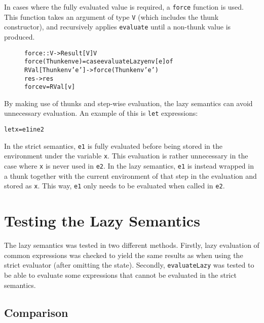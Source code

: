 In cases where the fully evaluated value is required, a \texttt{force} function is used.
This function takes an argument of type \texttt{V} (which includes the thunk constructor),
and recursively applies \texttt{evaluate} until a non-thunk value is produced.

\begin{figure}[!ht]
\begin{alltt}
force :: V -> Result [V] V
force (Thunk env e) = case evaluateLazy env [e] of
  RVal [Thunk env' e'] -> force (Thunk env' e')
  res -> res
force v = RVal [v]
\end{alltt}
\end{figure}

By making use of thunks and step-wise evaluation, the lazy semantics can avoid unnecessary
evaluation. An example of this is \texttt{let} expressions:
\begin{alltt}
  let x = e1 in e2
\end{alltt}
In the strict semantics, \texttt{e1} is fully evaluated before being stored in the
environment under the variable \texttt{x}. 
This evaluation is rather unnecessary in the case where \texttt{x} is never used in
\texttt{e2}. In the lazy semantics, \texttt{e1} is instead wrapped in a thunk together with
the current environment of that step in the evaluation and stored as \texttt{x}. This way,
\texttt{e1} only needs to be evaluated when called in \texttt{e2}.

\section{Testing the Lazy Semantics}
\label{LazySemTest}

The lazy semantics was tested in two different methods.
Firstly, lazy evaluation of common
expressions was checked to yield the same results as when using the strict
evaluator (after omitting the state). Secondly, \texttt{evaluateLazy}
was tested to be able to evaluate some expressions that cannot be evaluated
in the strict semantics.


\subsection{Comparison}

